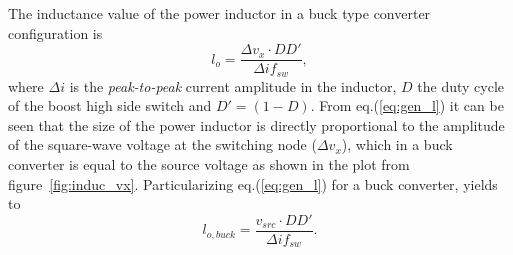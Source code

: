 The inductance value of the power inductor in a buck type converter configuration is
\begin{equation}
 l_{o}   = \frac{\Delta v_{x} \cdot DD'}{\Delta i f_{sw}},
\label{eq:gen_l}
\end{equation}
where $\Delta i$ is the \emph{peak-to-peak} current amplitude in the inductor, $D$ the duty cycle of the boost high side switch and $D'=(1-D)$. From eq.(\ref{eq:gen_l}) it can be seen that the size of the power inductor is directly proportional to the amplitude of the square-wave voltage at the switching node ($\Delta v_x$), which in a buck converter is equal to the source voltage as shown in the plot from figure~\ref{fig:induc_vx}. Particularizing eq.(\ref{eq:gen_l}) for a buck converter, yields to
\begin{equation}
 l_{o,buck}  = \frac{v_{src} \cdot DD'}{\Delta i f_{sw} }.
\label{eq:buck_l}
\end{equation}


